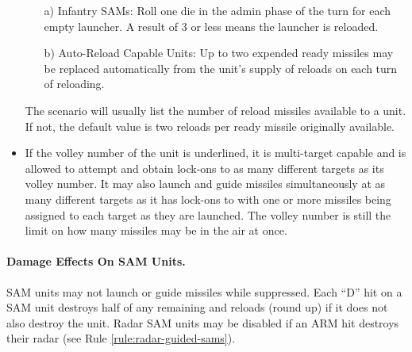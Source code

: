 \begin{itemize}
    \begin{enumerate}
        \item[a)] Infantry SAMs: Roll one die in the admin phase of the turn for each empty launcher. A result of 3 or less means the launcher is reloaded.

        \item[b)] Auto-Reload Capable Units: Up to two expended ready missiles may be replaced automatically from the unit's supply of reloads on each turn of reloading.
    \end{enumerate}

    The scenario will usually list the number of reload missiles available to a unit. If not, the default value is two reloads per ready missile originally available.

    \item{} If the volley number of the unit is underlined, it is multi-target capable and is allowed to attempt and obtain lock-ons to as many different targets as its volley number. It may also launch and guide missiles simultaneously at as many different targets as it has lock-ons to with one or more missiles being assigned to each target as they are launched. The volley number is still the limit on how many missiles may be in the air at once.   

\end{itemize}

\paragraph{Damage Effects On SAM Units.} SAM units may not launch or guide missiles while suppressed. Each “D” hit on a SAM unit destroys half of any remaining  and reloads (round up) if it does not also destroy the unit. Radar SAM units may be disabled if an ARM hit destroys their radar (see Rule \ref{rule:radar-guided-sams}).


